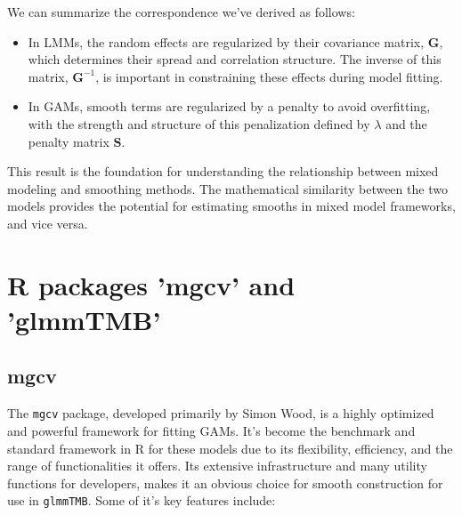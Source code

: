 \documentclass[12pt, twoside,hidelinks]{article}
\theoremstyle{definition}
\numberwithin{equation}{section}
\begin{document}
\begin{enumerate}
We can summarize the correspondence we've derived as follows:
\begin{itemize}
    \item In LMMs, the random effects are regularized by their covariance matrix, \(\mathbf{G}\), which determines their spread and correlation structure. The inverse of this matrix, \(\mathbf{G}^{-1}\), is important in constraining these effects during model fitting.
    \item In GAMs, smooth terms are regularized by a penalty to avoid overfitting, with the strength and structure of this penalization defined by \(\lambda\) and the penalty matrix \(\mathbf{S}\).
\end{itemize}
\end{enumerate}

This result is the foundation for understanding the relationship between mixed modeling and smoothing methods. The mathematical similarity between the two models provides the potential for estimating smooths in mixed model frameworks, and vice versa.

\section{R packages 'mgcv' and 'glmmTMB'}\label{sec:rpack:}

\subsection{mgcv}\label{sec:rpack:mgcv}

The \texttt{mgcv} package, developed primarily by Simon Wood, is a highly optimized and powerful framework for fitting GAMs. It's  become the benchmark and standard framework in R for these models due to its flexibility, efficiency, and the range of functionalities it offers. Its extensive infrastructure and many utility functions for developers, makes it an obvious choice for smooth construction for use in \texttt{glmmTMB}. Some of it's key features include:
\end{document}
